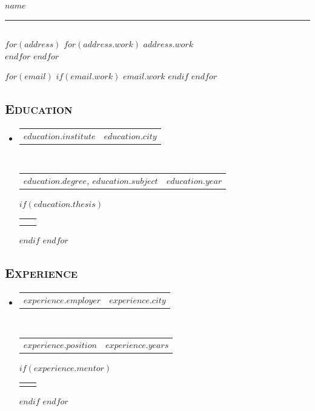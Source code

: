 \documentclass[12pt, letterpaper]{article}
\makeatletter
\newcommand{\headerrow}[2]
{\begin{tabular*}{\linewidth}{l@{\extracolsep{\fill}}r}
	#1 &
	#2 \\
\end{tabular*}}
\makeatother
\begin{document}
{\noindent\Large\textbf{$name$}}\\
\hrule

\subsection*{}

$for(address)$
$for(address.work)$
$address.work$\\
$endfor$
$endfor$

$for(email)$
$if(email.work)$
\href{mailto:$email.work$}{$email.work$}
$endif$
$endfor$

%	


\subsection*{\textsc{Education}}
\begin{itemize}
	\parskip=0.1em
    
  $for(education)$
	\item 
	\headerrow
		{\textbf{$education.institute$}}
		{\textbf{$education.city$}}
	\\
	\headerrow
		{\emph{$education.degree$, $education.subject$}}
		{\emph{$education.year$}}
	$if(education.thesis)$
	\\
	\headerrow
	{
	\quad {\small Thesis: $education.thesis$}
	\\ 
	\quad {\small Advisor: $education.advisor$}
	}
	{}
	$endif$
	$endfor$
\end{itemize}


\subsection*{\textsc{Experience}}
\begin{itemize}
	\parskip=0.1em
	
	$for(experience)$
	\item
	\headerrow
	{\textbf{$experience.employer$}}
	{\textbf{$experience.city$}}
	\\
	\headerrow
	{\emph{$experience.position$}}
	{\emph{$experience.years$}}
	$if(experience.mentor)$
		\\
		\headerrow
		{\quad {\small Mentor: $experience.mentor$}}
		{}
	$endif$
	$endfor$
\end{itemize}
\end{document}
